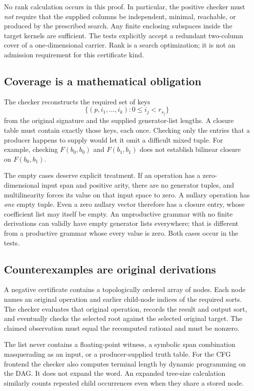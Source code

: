 \documentclass[11pt,letterpaper]{article}
\theoremstyle{definition}\newtheorem{definition}[theorem]{Definition}
\theoremstyle{remark}\newtheorem{remark}[theorem]{Remark}
\begin{document}
No rank calculation occurs in this proof. In particular, the positive checker must \emph{not} require that the supplied columns be independent, minimal, reachable, or produced by the prescribed search. Any finite enclosing subspaces inside the target kernels are sufficient. The tests explicitly accept a redundant two-column cover of a one-dimensional carrier. Rank is a search optimization; it is not an admission requirement for this certificate kind.

\subsection{Coverage is a mathematical obligation}
The checker reconstructs the required set of keys
\[
 \{(p,i_1,\ldots,i_k):0\le i_j<r_{s_j}\}
\]
from the original signature and the supplied generator-list lengths. A closure table must contain exactly those keys, each once. Checking only the entries that a producer happens to supply would let it omit a difficult mixed tuple. For example, checking $F(b_0,b_0)$ and $F(b_1,b_1)$ does not establish bilinear closure on $F(b_0,b_1)$.

The empty cases deserve explicit treatment. If an operation has a zero-dimensional input span and positive arity, there are no generator tuples, and multilinearity forces its value on that input space to zero. A nullary operation has \emph{one} empty tuple. Even a zero nullary vector therefore has a closure entry, whose coefficient list may itself be empty. An unproductive grammar with no finite derivations can validly have empty generator lists everywhere; that is different from a productive grammar whose every value is zero. Both cases occur in the tests.

\subsection{Counterexamples are original derivations}
A negative certificate contains a topologically ordered array of nodes. Each node names an original operation and earlier child-node indices of the required sorts. The checker evaluates that original operation, records the result and output sort, and eventually checks the selected root against the selected original target. The claimed observation must equal the recomputed rational and must be nonzero.

The list never contains a floating-point witness, a symbolic span combination masquerading as an input, or a producer-supplied truth table. For the CFG frontend the checker also computes terminal length by dynamic programming on the DAG. It does not expand the word. An expanded tree-size calculation similarly counts repeated child occurrences even when they share a stored node.
\end{document}
